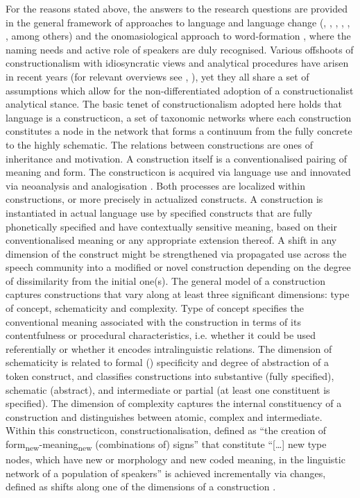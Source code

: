 \documentclass[output=paper]{LSP/langsci}
\begin{document}
For the reasons stated above, the answers to the research questions are provided in the general framework of  approaches to language and language change (\citealt{Booij2009a}, \citeyear{Booij2010}, \citealt{Croft2001}, \citealt{Goldberg2006}, \citealt{Hilpert2015}, \citealt{Traugott2013}, among others) and the onomasiological approach to word-formation \citep{Štekauer1998,Štekauer2005}, where the naming needs and active role of speakers are duly recognised.                                                                           Various offshoots of constructionalism with idiosyncratic views and analytical procedures have arisen in recent years (for relevant overviews see \citealt{Croft2007}, \citealt{Sag2012intro}), yet they all share a set of assumptions which allow for the non-differentiated adoption of a constructionalist analytical stance. The basic tenet of constructionalism adopted here holds that language is a constructicon, a set of taxonomic networks where each construction constitutes a node in the network that forms a continuum from the fully concrete to the highly schematic. The relations between constructions are ones of inheritance and motivation. A construction itself is a conventionalised pairing of meaning and form. The constructicon is acquired via language use and innovated via neoanalysis and analogisation \citep{Traugott2013}. Both processes are localized within constructions, or more precisely in actualized constructs. A construction is instantiated in actual language use by specified constructs that are fully phonetically specified and have contextually sensitive meaning, based on their conventionalised meaning or any appropriate extension thereof. A shift in any dimension of the construct might be strengthened via propagated use across the speech community into a modified or novel construction depending on the degree of dissimilarity from the initial one(s). The general model of a construction captures constructions that vary along at least three significant dimensions: type of concept, schematicity and complexity. Type of concept specifies the conventional meaning associated with the construction in terms of its contentfulness or procedural characteristics, i.e. whether it could be used referentially or whether it encodes intralinguistic relations. The dimension of schematicity is related to formal () specificity and degree of abstraction of a token construct, and classifies constructions into substantive (fully specified), schematic (abstract), and intermediate or partial (at least one constituent is specified). The dimension of complexity captures the internal constituency of a construction and distinguishes between atomic, complex and intermediate. Within this constructicon, constructionalisation, defined as “the creation of form\textsubscript{new}-meaning\textsubscript{new} (combinations of) signs” that constitute “[…] new type nodes, which have new  or morphology and new coded meaning, in the linguistic network of a population of speakers” \citep[22]{Traugott2013} is achieved incrementally via  changes, defined as shifts along one of the dimensions of a construction \citep[26]{Traugott2013}.                                                                                      
\end{document}

